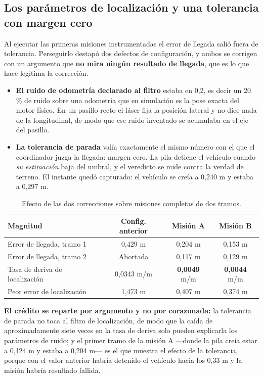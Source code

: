 \documentclass[12pt,letterpaper]{article}
\begin{document}
\subsection{Los parámetros de localización y una tolerancia con margen cero}

Al ejecutar las primeras misiones instrumentadas el error de llegada salió fuera de tolerancia. Perseguirlo destapó dos defectos de configuración, y ambos se corrigen con un argumento que \textbf{no mira ningún resultado de llegada}, que es lo que hace legítima la corrección.

\begin{itemize}
    \item \textbf{El ruido de odometría declarado al filtro} estaba en 0,2, es decir un 20 \% de ruido sobre una odometría que en simulación es la pose exacta del motor físico. En un pasillo recto el láser fija la posición lateral y no dice nada de la longitudinal, de modo que ese ruido inventado se acumulaba en el eje del pasillo.
    \item \textbf{La tolerancia de parada} valía exactamente el mismo número con el que el coordinador juzga la llegada: margen cero. La pila detiene el vehículo cuando \emph{su estimación} baja del umbral, y el veredicto se mide contra la verdad de terreno. El instante quedó capturado: el vehículo se creía a 0,240 m y estaba a 0,297 m.
\end{itemize}

\begin{table}[H]
    \centering
    \small
    \caption{Efecto de las dos correcciones sobre misiones completas de dos tramos.}
    \label{tab:alphas}
    \begin{tabular}{@{}lccc@{}}
        \toprule
        \textbf{Magnitud} & \textbf{Config. anterior} & \textbf{Misión A} & \textbf{Misión B} \\ \midrule
        Error de llegada, tramo 1 & 0,429 m & 0,204 m & 0,153 m \\
        Error de llegada, tramo 2 & Abortada & 0,117 m & 0,129 m \\
        Tasa de deriva de localización & 0,0343 m/m & \textbf{0,0049} m/m & \textbf{0,0044} m/m \\
        Peor error de localización & 1,473 m & 0,407 m & 0,374 m \\ \bottomrule
    \end{tabular}
\end{table}

\textbf{El crédito se reparte por argumento y no por corazonada:} la tolerancia de parada no toca al filtro de localización, de modo que la caída de aproximadamente siete veces en la tasa de deriva solo pueden explicarla los parámetros de ruido; y el primer tramo de la misión A ---donde la pila creía estar a 0,124 m y estaba a 0,204 m--- es el que muestra el efecto de la tolerancia, porque con el valor anterior habría detenido el vehículo hacia los 0,33 m y la misión habría resultado fallida.
\end{document}
